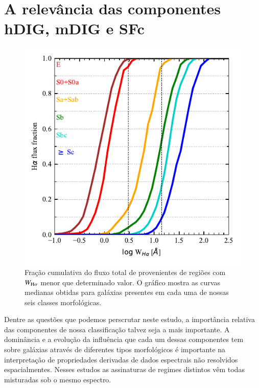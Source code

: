 \section{A relevância das componentes hDIG, mDIG e SFc}
\label{sec:DIGdisc:relstrenghts}

\begin{figure}
 \includegraphics{figuras/fig_cumul_fHaWHa_per_morftype.pdf}
 \caption[Fração cumulativa do fluxo de ${\rm H}\alpha$ com o crescimento de $W_{{\rm H}\alpha}$ para diferentes classes morfológicas]
 {Fração cumulativa do fluxo total de \Ha provenientes de regiões com $W_{\Ha}$ menor que determinado valor. O gráfico mostra as curvas medianas obtidas para galáxias presentes em cada uma de nossas seis classes morfológicas.}
 \label{fig:CurveOfGrowth}
\end{figure}

Dentre as questões que podemos perscrutar neste estudo, a importância relativa das componentes de nossa classificação talvez seja a mais importante. A dominância e a evolução da influência que cada um dessas componentes tem sobre galáxias através de diferentes tipos morfológicos é importante na interpretação de propriedades derivadas de dados espectrais não resolvidos espacialmentes. Nesses estudos as assinaturas de regimes distintos vêm todas misturadas sob o mesmo espectro.

